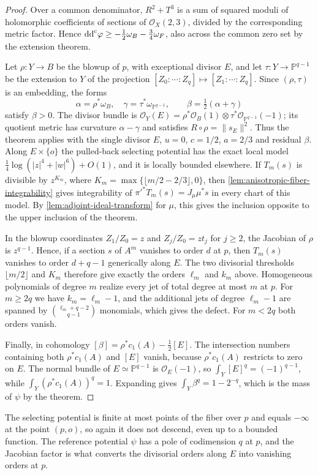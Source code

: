\begin{proof}
Over a common denominator, $R^2+T^3$ is a sum of squared moduli of holomorphic coefficients of sections of $\mathcal O_X(2,3)$, divided by the corresponding metric factor. Hence $\mathrm{dd}^{\mathrm{c}}\varphi\geq-\tfrac12\omega_B-\tfrac34\omega_F$, also across the common zero set by the extension theorem.

Let $\rho\colon Y\to B$ be the blowup of $p$, with exceptional divisor $E$, and let $\tau\colon Y\to\mathbb P^{q-1}$ be the extension to $Y$ of the projection $[Z_0:\cdots:Z_q]\mapsto[Z_1:\cdots:Z_q]$. Since $(\rho,\tau)$ is an embedding, the forms
\[
 \alpha=\rho^*\omega_B,\quad\gamma=\tau^*\omega_{\mathbb P^{q-1}},\qquad
 \beta=\tfrac12(\alpha+\gamma)
\]
satisfy $\beta>0$. The divisor bundle is $\mathcal O_Y(E)=\rho^*\mathcal O_B(1)\otimes\tau^*\mathcal O_{\mathbb P^{q-1}}(-1)$; its quotient metric has curvature $\alpha-\gamma$ and satisfies $R\circ\rho=\|s_E\|^2$. Thus the theorem applies with the single divisor $E$, $u=0$, $c=1/2$, $a=2/3$ and residual $\beta$. Along $E\times\{o\}$ the pulled-back selecting potential has the exact local model $\tfrac14\log(|z|^4+|w|^6)+O(1)$, and it is locally bounded elsewhere. If $T_m(s)$ is divisible by $z^{K_m}$, where $K_m=\max\{\lfloor m/2-2/3\rfloor,0\}$, then \cref{lem:anisotropic-fiber-integrability} gives integrability of $\pi'^*T_m(s)=J_\mu\mu^*s$ in every chart of this model. By \cref{lem:adjoint-ideal-transform} for $\mu$, this gives the inclusion opposite to the upper inclusion of the theorem.

In the blowup coordinates $Z_1/Z_0=z$ and $Z_j/Z_0=zt_j$ for $j\geq2$, the Jacobian of $\rho$ is $z^{q-1}$. Hence, if a section $s$ of $A^m$ vanishes to order $d$ at $p$, then $T_m(s)$ vanishes to order $d+q-1$ generically along $E$. The two divisorial thresholds $\lfloor m/2\rfloor$ and $K_m$ therefore give exactly the orders $\ell_m$ and $k_m$ above. Homogeneous polynomials of degree $m$ realize every jet of total degree at most $m$ at $p$. For $m\geq2q$ we have $k_m=\ell_m-1$, and the additional jets of degree $\ell_m-1$ are spanned by $\binom{\ell_m+q-2}{q-1}$ monomials, which gives the defect. For $m<2q$ both orders vanish.

Finally, in cohomology $[\beta]=\rho^*c_1(A)-\tfrac12[E]$. The intersection numbers containing both $\rho^*c_1(A)$ and $[E]$ vanish, because $\rho^*c_1(A)$ restricts to zero on $E$. The normal bundle of $E\simeq\mathbb P^{q-1}$ is $\mathcal O_E(-1)$, so $\int_Y[E]^q=(-1)^{q-1}$, while $\int_Y(\rho^*c_1(A))^q=1$. Expanding gives $\int_Y\beta^q=1-2^{-q}$, which is the mass of $\psi$ by the theorem.
\end{proof}

The selecting potential is finite at most points of the fiber over $p$ and equals $-\infty$ at the point $(p,o)$, so again it does not descend, even up to a bounded function. The reference potential $\psi$ has a pole of codimension $q$ at $p$, and the Jacobian factor is what converts the divisorial orders along $E$ into vanishing orders at $p$.


